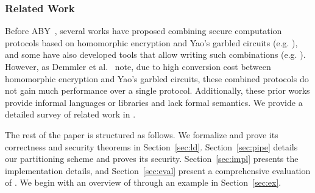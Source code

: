 \subsubsection*{Related Work}
Before ABY~\cite{aby}, several works have proposed
combining secure computation protocols based on homomorphic
encryption and Yao's garbled circuits
(e.g. \cite{barni,blanton,brickell,franz,huang,valeriaMatrix,valeriaRidge,schropferK11}),
and some have also developed tools that allow writing such
combinations (e.g. \cite{bogdanov,lone,tasty,autoS}). However, as Demmler et
al.~\cite{aby} note, due
 to high conversion cost between
homomorphic encryption and Yao's garbled circuits, these combined
protocols do not gain much performance over a single
protocol. 
Additionally, these prior works provide informal languages
or libraries and lack formal semantics.
 We provide a detailed survey of related
work in .

The rest of the paper is structured as follows. We formalize \tool and
prove its correctness and security theorems in
Section~\ref{sec:ld}. Section~\ref{sec:pipe} details our partitioning
scheme and proves its security. Section~\ref{sec:impl}
presents the implementation details, and
Section~\ref{sec:eval} present a comprehensive evaluation of \tool. We
begin with an overview of \tool through an example in
Section~\ref{sec:ex}. %





